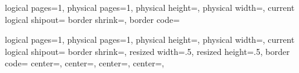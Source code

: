%
{%
  \edef\pgfpageoptionheight{\the\paperwidth}
  \edef\pgfpageoptionwidth{\the\paperheight}
  \def\pgfpageoptionborder{0pt}
  \def\pgfpageoptionfirstshipout{1}
  \def\pgfpageoptionbordercode{}
}%
{%
  \pgfpagesphysicalpageoptions
  {%
    logical pages=1,%
    physical pages=1,%
    physical height=\pgfpageoptionheight,%
    physical width=\pgfpageoptionwidth,%
    current logical shipout=\pgfpageoptionfirstshipout%
  }
  \pgfpagessetdefaults
  {%
    border shrink=\pgfpageoptionborder,%
    border code=\pgfpageoptionbordercode
  }
  \ifdim\paperheight>\paperwidth\relax
  \pgfpageslogicalpageoptions{1}
  {%
    resized width=.5\pgfphysicalwidth,%
    resized height=\pgfphysicalheight,%
    center=\pgfpoint{.25\pgfphysicalwidth}{.5\pgfphysicalheight},%
  }
  \pgfpageslogicalpageoptions{1}
  {%
    resized width=.5\pgfphysicalwidth,%
    resized height=\pgfphysicalheight,%
    center=\pgfpoint{.75\pgfphysicalwidth}{.5\pgfphysicalheight},%
  }
  \else
  \pgfpageslogicalpageoptions{1}
  {%
    resized width=\pgfphysicalwidth,%
    resized height=.5\pgfphysicalheight,%
    center=\pgfpoint{.5\pgfphysicalwidth}{.75\pgfphysicalheight},%
  }
  \pgfpageslogicalpageoptions{1}
  {%
    resized width=\pgfphysicalwidth,%
    resized height=.5\pgfphysicalheight,%
    center=\pgfpoint{.5\pgfphysicalwidth}{.25\pgfphysicalheight},%
  }
  \fi
}

%
{%
  \edef\pgfpageoptionheight{\the\paperheight}
  \edef\pgfpageoptionwidth{\the\paperwidth}
  \def\pgfpageoptionborder{0pt}
  \def\pgfpageoptionfirstshipout{1}
  \def\pgfpageoptionbordercode{}
}%
{%
  \pgfpagesphysicalpageoptions
  {%
    logical pages=1,%
    physical pages=1,%
    physical height=\pgfpageoptionheight,%
    physical width=\pgfpageoptionwidth,%
    current logical shipout=\pgfpageoptionfirstshipout%
  }
  \pgfpagessetdefaults
  {%
    border shrink=\pgfpageoptionborder,%
    resized width=.5\pgfphysicalwidth,%
    resized height=.5\pgfphysicalheight,%
    border code=\pgfpageoptionbordercode
  }
  {%
    center=\pgfpoint{.25\pgfphysicalwidth}{.25\pgfphysicalheight},
  }
  {%
    center=\pgfpoint{.75\pgfphysicalwidth}{.25\pgfphysicalheight},
  }
  {%
    center=\pgfpoint{.25\pgfphysicalwidth}{.75\pgfphysicalheight},
  }
  {%
    center=\pgfpoint{.75\pgfphysicalwidth}{.75\pgfphysicalheight},
  }
}

